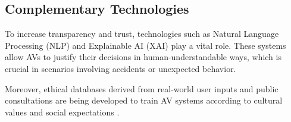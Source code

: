 \subsection{Complementary Technologies}

To increase transparency and trust, technologies such as Natural Language Processing (NLP) and Explainable AI (XAI) play a vital role. These systems allow AVs to justify their decisions in human-understandable ways, which is crucial in scenarios involving accidents or unexpected behavior.

Moreover, ethical databases derived from real-world user inputs and public consultations are being developed to train AV systems according to cultural values and social expectations \cite{shariff2018moral, millar2022ethical}.

